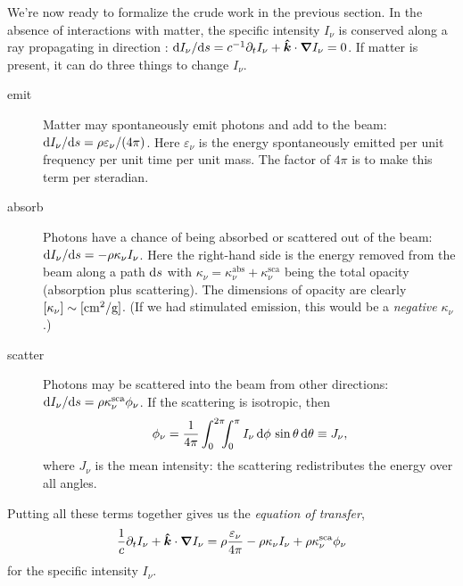 We're now ready to formalize the crude work in the previous section.
In the absence of interactions with matter, the specific intensity $I_{\nu}$ is conserved along a ray propagating in direction \unitk: $\mathrm{d} I_{\nu}/\mathrm{d} s = c^{-1}\partial_{t}I_{\nu} + \boldsymbol{\hat{k}}\cdot\boldsymbol{\nabla} I_{\nu} = 0$. If matter is present, it can do three things to change $I_{\nu}$.
\begin{description}
\item[emit] Matter may spontaneously emit photons and add to the beam: $\mathrm{d} I_{\nu}/\mathrm{d} s = \rho\varepsilon_{\nu}/(4\pi)$. Here $\varepsilon_{\nu}$ is the energy spontaneously emitted per unit frequency per unit time per unit mass.  The factor of $4\pi$ is to make this term per steradian.

\item[absorb] Photons have a chance of being absorbed or scattered out of the beam: $\mathrm{d} I_{\nu}/\mathrm{d} s = -\rho\kappa_{\nu}I_{\nu}$. Here the right-hand side is the energy removed from the beam along a path $\mathrm{d} s$ with $\kappa_{\nu} = \kappa_{\nu}^{\mathrm{abs}} + \kappa_{\nu}^{\mathrm{sca}}$ being the total opacity (absorption plus scattering). The dimensions of opacity are clearly $[\kappa_{\nu}] \sim [\mathrm{c}\mathrm{m}^{2}/\mathrm{g}]$. (If we had stimulated emission, this would be a \emph{negative} $\kappa_{\nu}$.)

\item[scatter] Photons may be scattered into the beam from other directions: $\mathrm{d} I_{\nu}/\mathrm{d} s = \rho\kappa_{\nu}^{\mathrm{sca}}\phi_{\nu}$. If the scattering is isotropic, then
\begin{equation}\label{e.isosca}
\phi_{\nu} = \frac{1}{4\pi}\int_{0}^{2\pi}\!\!\!\int_{0}^{\pi} I_{\nu}\,\mathrm{d}\phi\,\sin\theta\,\mathrm{d}\theta \equiv J_{\nu},
\end{equation}
where $J_{\nu}$ is the mean intensity: the scattering redistributes the energy over all angles.
\end{description}
Putting all these terms together gives us the \emph{equation of transfer},
\begin{equation}\label{e.transfer}
\frac{1}{c}\partial_{t}I_{\nu} + \boldsymbol{\hat{k}}\cdot\boldsymbol{\nabla} I_{\nu} = \rho \frac{\varepsilon_{\nu}}{4\pi} - \rho\kappa_{\nu} I_{\nu} + \rho\kappa_{\nu}^{\mathrm{sca}}\phi_{\nu}
\end{equation}
for the specific intensity $I_{\nu}$.


